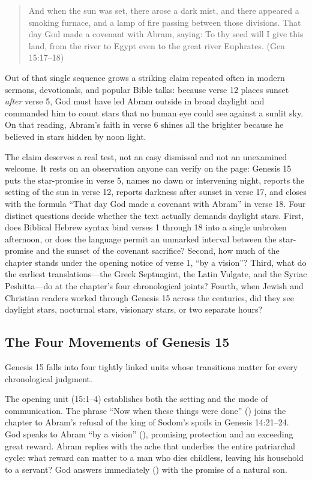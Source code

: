 \begin{quote}
And when the sun was set, there arose a dark mist, and there appeared a smoking furnace, and a lamp of fire passing between those divisions. That day God made a covenant with Abram, saying: To thy seed will I give this land, from the river to Egypt even to the great river Euphrates. (Gen 15:17--18)
\end{quote}

Out of that single sequence grows a striking claim repeated often in modern sermons, devotionals, and popular Bible talks: because verse 12 places sunset \emph{after} verse 5, God must have led Abram outside in broad daylight and commanded him to count stars that no human eye could see against a sunlit sky. On that reading, Abram's faith in verse 6 shines all the brighter because he believed in stars hidden by noon light.

The claim deserves a real test, not an easy dismissal and not an unexamined welcome. It rests on an observation anyone can verify on the page: Genesis 15 puts the star-promise in verse 5, names no dawn or intervening night, reports the setting of the sun in verse 12, reports darkness after sunset in verse 17, and closes with the formula ``That day God made a covenant with Abram'' in verse 18. Four distinct questions decide whether the text actually demands daylight stars. First, does Biblical Hebrew syntax bind verses 1 through 18 into a single unbroken afternoon, or does the language permit an unmarked interval between the star-promise and the sunset of the covenant sacrifice? Second, how much of the chapter stands under the opening notice of verse 1, ``by a vision''? Third, what do the earliest translations---the Greek Septuagint, the Latin Vulgate, and the Syriac Peshitta---do at the chapter's four chronological joints? Fourth, when Jewish and Christian readers worked through Genesis 15 across the centuries, did they see daylight stars, nocturnal stars, visionary stars, or two separate hours?

\subsection{The Four Movements of Genesis 15}

Genesis 15 falls into four tightly linked units whose transitions matter for every chronological judgment.

The opening unit (15:1--4) establishes both the setting and the mode of communication. The phrase ``Now when these things were done'' () joins the chapter to Abram's refusal of the king of Sodom's spoils in Genesis 14:21--24. God speaks to Abram ``by a vision'' (), promising protection and an exceeding great reward. Abram replies with the ache that underlies the entire patriarchal cycle: what reward can matter to a man who dies childless, leaving his household to a servant? God answers immediately () with the promise of a natural son.

